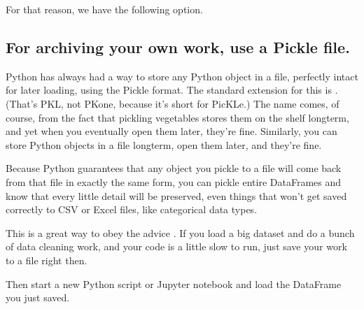 \documentclass[letterpaper,10pt,english]{jupyterBook}
\begin{document}
\sphinxAtStartPar
For that reason, we have the following option.


\subsection{For archiving your own work, use a Pickle file.}
\label{\detokenize{chapter-13-etl:for-archiving-your-own-work-use-a-pickle-file}}
\sphinxAtStartPar
Python has always had a way to store any Python object in a file, perfectly intact for later loading, using the Pickle format.  The standard extension for this is .  (That’s P\sphinxhyphen{}K\sphinxhyphen{}L, not P\sphinxhyphen{}K\sphinxhyphen{}one, because it’s short for PicKLe.)  The name comes, of course, from the fact that pickling vegetables stores them on the shelf long\sphinxhyphen{}term, and yet when you eventually open them later, they’re fine.  Similarly, you can store Python objects in a file long\sphinxhyphen{}term, open them later, and they’re fine.

\sphinxAtStartPar
Because Python guarantees that any object you pickle to a file will come back from that file in exactly the same form, you can pickle entire DataFrames and know that every little detail will be preserved, even things that won’t get saved correctly to CSV or Excel files, like categorical data types.

\sphinxAtStartPar
This is a great way to obey the advice .  If you load a big dataset and do a bunch of data cleaning work, and your code is a little slow to run, just save your work to a file right then.

\begin{sphinxVerbatim}[commandchars=\\\{\}]
  
\end{sphinxVerbatim}

\sphinxAtStartPar
Then start a new Python script or Jupyter notebook and load the DataFrame you just saved.

\begin{sphinxVerbatim}[commandchars=\\\{\}]
    
\end{sphinxVerbatim}
\end{document}
